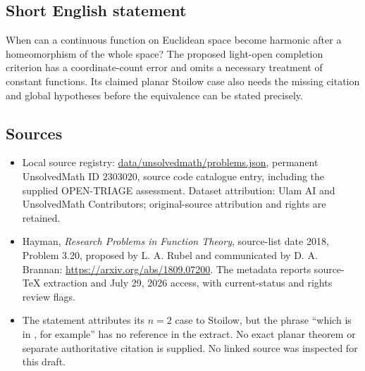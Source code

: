 \documentclass[11pt]{article}
\begin{document}
\subsection{Short English statement}
When can a continuous function on Euclidean space become harmonic after a homeomorphism of the whole space? The proposed light-open completion criterion has a coordinate-count error and omits a necessary treatment of constant functions. Its claimed planar Stoilow case also needs the missing citation and global hypotheses before the equivalence can be stated precisely.
\subsection{Sources}
\begin{itemize}
\item Local source registry: \url{data/unsolvedmath/problems.json}, permanent UnsolvedMath ID $2303020$, source code catalogue entry, including the supplied OPEN-TRIAGE assessment. Dataset attribution: Ulam AI and UnsolvedMath Contributors; original-source attribution and rights are retained.
\item Hayman, \emph{Research Problems in Function Theory}, source-list date 2018, Problem 3.20, proposed by L. A. Rubel and communicated by D. A. Brannan: \url{https://arxiv.org/abs/1809.07200}. The metadata reports source-TeX extraction and July 29, 2026 access, with current-status and rights review flags.
\item The statement attributes its $n=2$ case to Stoilow, but the phrase ``which is in , for example'' has no reference in the extract. No exact planar theorem or separate authoritative citation is supplied. No linked source was inspected for this draft.
\end{itemize}
\end{document}
